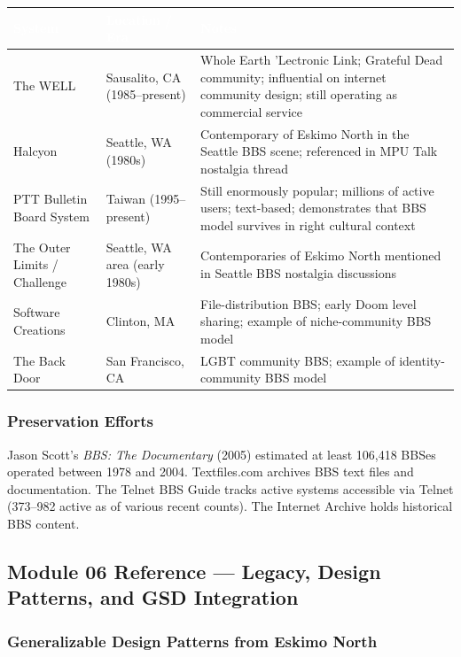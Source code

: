 \documentclass[11pt,letterpaper]{article}
\newcommand{\tableheader}[1]{\textbf{\sffamily\textcolor{white}{#1}}}
\begin{document}
\begin{center}
\begin{tabularx}{\textwidth}{L{3cm}L{3cm}X}
\toprule
{}
\tableheader{System} & \tableheader{Location / Era} & \tableheader{Notes} \\
\midrule
The WELL & Sausalito, CA (1985--present) & Whole Earth 'Lectronic Link; Grateful Dead community; influential on internet community design; still operating as commercial service \\
Halcyon & Seattle, WA (1980s) & Contemporary of Eskimo North in the Seattle BBS scene; referenced in MPU Talk nostalgia thread \\
PTT Bulletin Board System & Taiwan (1995--present) & Still enormously popular; millions of active users; text-based; demonstrates that BBS model survives in right cultural context \\
The Outer Limits / Challenge & Seattle, WA area (early 1980s) & Contemporaries of Eskimo North mentioned in Seattle BBS nostalgia discussions \\
Software Creations & Clinton, MA & File-distribution BBS; early Doom level sharing; example of niche-community BBS model \\
The Back Door & San Francisco, CA & LGBT community BBS; example of identity-community BBS model \\
\bottomrule
\end{tabularx}
\end{center}

\subsubsection{Preservation Efforts}

Jason Scott's \textit{BBS: The Documentary} (2005) estimated at least 106,418 BBSes operated between 1978 and 2004. Textfiles.com archives BBS text files and documentation. The Telnet BBS Guide tracks active systems accessible via Telnet (373--982 active as of various recent counts). The Internet Archive holds historical BBS content.

\subsection{Module 06 Reference --- Legacy, Design Patterns, and GSD Integration}

\subsubsection{Generalizable Design Patterns from Eskimo North}
\end{document}
